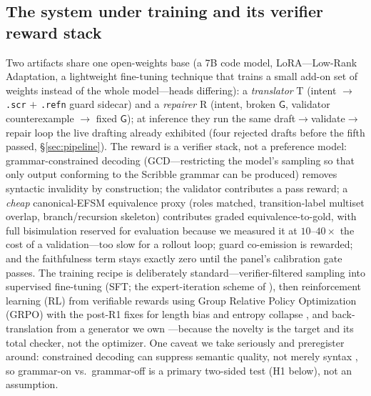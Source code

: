 \documentclass{article}
\newcommand{\gtG}{\mathsf{G}}
\begin{document}
\subsection{The system under training and its verifier reward stack}
Two artifacts share one open-weights base (a 7B code model, LoRA---Low-Rank Adaptation, a lightweight fine-tuning technique that trains a small add-on set of weights instead of the whole model---heads differing): a \emph{translator} T (intent $\to$ \texttt{.scr} $+$ \texttt{.refn} guard sidecar) and a \emph{repairer} R (intent, broken $\gtG$, validator counterexample $\to$ fixed $\gtG$); at inference they run the same draft$\to$validate$\to$repair loop the live drafting already exhibited (four rejected drafts before the fifth passed, \S\ref{sec:pipeline}). The reward is a verifier stack, not a preference model: grammar-constrained decoding (GCD---restricting the model's sampling so that only output conforming to the Scribble grammar can be produced) removes syntactic invalidity by construction; the validator contributes a pass reward; a \emph{cheap} canonical-EFSM equivalence proxy (roles matched, transition-label multiset overlap, branch/recursion skeleton) contributes graded equivalence-to-gold, with full bisimulation reserved for evaluation because we measured it at $10$--$40\times$ the cost of a validation---too slow for a rollout loop; guard co-emission is rewarded; and the faithfulness term stays exactly zero until the panel's calibration gate passes. The training recipe is deliberately standard---verifier-filtered sampling into supervised fine-tuning (SFT; the expert-iteration scheme of \citealt{star22}), then reinforcement learning (RL) from verifiable rewards using Group Relative Policy Optimization (GRPO) \citep{deepseekmath} with the post-R1 fixes for length bias and entropy collapse \citep{dapo,gspo,drgrpo}, and back-translation from a generator we own \citep{sennrich16,autoform}---because the novelty is the target and its total checker, not the optimizer. One caveat we take seriously and preregister around: constrained decoding can suppress semantic quality, not merely syntax \citep{formattax26,crane25}, so grammar-on vs.\ grammar-off is a primary two-sided test (H1 below), not an assumption.
\end{document}
